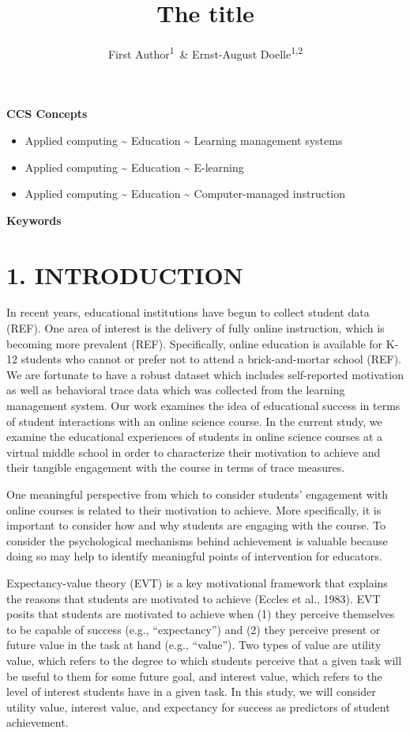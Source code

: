 \documentclass[acmart]{apa6}
\title{The title}
\author{First Author\textsuperscript{1}~\& Ernst-August Doelle\textsuperscript{1,2}}
\affiliation{
    \vspace{0.5cm}
          \textsuperscript{1} Wilhelm-Wundt-University\\
          \textsuperscript{2} Konstanz Business School  }
\providecommand{\tightlist}{%
  \setlength{\itemsep}{0pt}\setlength{\parskip}{0pt}}
\theoremstyle{definition}
\theoremstyle{definition}
\theoremstyle{definition}
\theoremstyle{remark}
\begin{document}
\maketitle

\setcounter{secnumdepth}{0}



\textbf{CCS Concepts}

\begin{itemize}
\tightlist
\item
  Applied computing \textasciitilde{} Education \textasciitilde{}
  Learning management systems
\item
  Applied computing \textasciitilde{} Education \textasciitilde{}
  E-learning
\item
  Applied computing \textasciitilde{} Education \textasciitilde{}
  Computer-managed instruction
\end{itemize}

\textbf{Keywords}

\section{1. INTRODUCTION}\label{introduction}

In recent years, educational institutions have begun to collect student
data (REF). One area of interest is the delivery of fully online
instruction, which is becoming more prevalent (REF). Specifically,
online education is available for K-12 students who cannot or prefer not
to attend a brick-and-mortar school (REF). We are fortunate to have a
robust dataset which includes self-reported motivation as well as
behavioral trace data which was collected from the learning management
system. Our work examines the idea of educational success in terms of
student interactions with an online science course. In the current
study, we examine the educational experiences of students in online
science courses at a virtual middle school in order to characterize
their motivation to achieve and their tangible engagement with the
course in terms of trace measures.

One meaningful perspective from which to consider students' engagement
with online courses is related to their motivation to achieve. More
specifically, it is important to consider how and why students are
engaging with the course. To consider the psychological mechanisms
behind achievement is valuable because doing so may help to identify
meaningful points of intervention for educators.

Expectancy-value theory (EVT) is a key motivational framework that
explains the reasons that students are motivated to achieve (Eccles et
al., 1983). EVT posits that students are motivated to achieve when (1)
they perceive themselves to be capable of success (e.g.,
\enquote{expectancy}) and (2) they perceive present or future value in
the task at hand (e.g., \enquote{value}). Two types of value are utility
value, which refers to the degree to which students perceive that a
given task will be useful to them for some future goal, and interest
value, which refers to the level of interest students have in a given
task. In this study, we will consider utility value, interest value, and
expectancy for success as predictors of student achievement.
\end{document}
